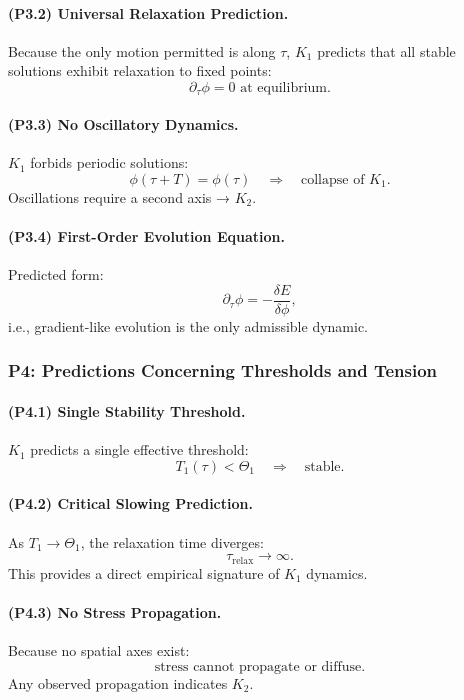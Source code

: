 \paragraph{(P3.2) Universal Relaxation Prediction.}
Because the only motion permitted is along $\tau$, $K_1$ predicts that
all stable solutions exhibit relaxation to fixed points:
\[
\partial_\tau \phi = 0 \text{ at equilibrium}.
\]

\paragraph{(P3.3) No Oscillatory Dynamics.}
$K_1$ forbids periodic solutions:
\[
\phi(\tau + T) = \phi(\tau)
\quad\Rightarrow\quad \text{collapse of } K_1.
\]
Oscillations require a second axis → $K_2$.

\paragraph{(P3.4) First-Order Evolution Equation.}
Predicted form:
\[
\partial_\tau \phi = -\frac{\delta E}{\delta\phi},
\]
i.e., gradient-like evolution is the only admissible dynamic.

\subsubsection{P4: Predictions Concerning Thresholds and Tension}

\paragraph{(P4.1) Single Stability Threshold.}
$K_1$ predicts a single effective threshold:
\[
T_1(\tau) < \Theta_1
\quad\Rightarrow\quad \text{stable}.
\]

\paragraph{(P4.2) Critical Slowing Prediction.}
As $T_1 \to \Theta_1$, the relaxation time diverges:
\[
\tau_{\mathrm{relax}} \to \infty.
\]
This provides a direct empirical signature of $K_1$ dynamics.

\paragraph{(P4.3) No Stress Propagation.}
Because no spatial axes exist:
\[
\text{stress cannot propagate or diffuse}.
\]
Any observed propagation indicates $K_2$.

